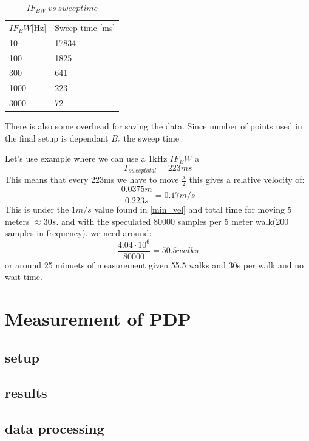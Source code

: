 \begin{table}[H]
\centering
\caption{$IF_{BW} \ vs \ sweep time$}
\label{my-label}
\begin{tabular}{l|l}
\hline
$IF_BW${[}Hz{]} & Sweep time {[}ms{]} \\
10              & 17834               \\
100             & 1825                \\
300             & 641                 \\
1000            & 223                 \\
3000            & 72                 
\end{tabular}
\end{table}

There is also some overhead for saving the data. Since number of points used in the final setup is dependant $B_c$ the sweep time 

Let's use example where we can use a 1kHz $IF_BW$ a
\begin{equation}
T_{sweep total} = 223ms
\end{equation}
This means that every 223ms we have to move $\frac{\lambda}{2}$ this gives a relative velocity of:
\begin{equation}
\frac{0.0375m}{0.223s} = 0.17 m/s
\end{equation}
This is under the $1m/s$ value found in \autoref{min_vel}
and total time for moving 5 meters $\approx 30s$.
and with the speculated 80000 samples per 5 meter walk(200 samples in frequency). we need around:
\begin{equation}
\frac{4.04 \cdot 10^6}{80000} = 50.5 walks
\end{equation}
or around 25 minuets of measurement given 55.5 walks and 30s per walk and no wait time.

\chapter{Measurement of PDP}
\section{setup}
\section{results}
\section{data processing}
